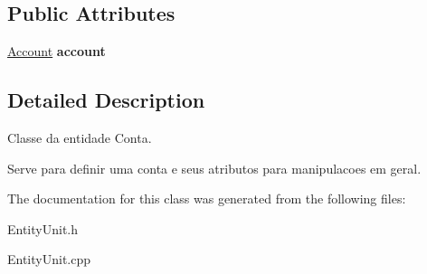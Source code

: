 \subsection*{Public Attributes}
\begin{DoxyCompactItemize}
\item 
\hypertarget{classAccount_a3a593680a06af1acefc2236125e7dd20}{\hyperlink{classAccount}{Account} {\bfseries account}}\label{classAccount_a3a593680a06af1acefc2236125e7dd20}

\end{DoxyCompactItemize}


\subsection{Detailed Description}
Classe da entidade Conta. 

Serve para definir uma conta e seus atributos para manipulacoes em geral. 

The documentation for this class was generated from the following files\-:\begin{DoxyCompactItemize}
\item 
Entity\-Unit.\-h\item 
Entity\-Unit.\-cpp\end{DoxyCompactItemize}
